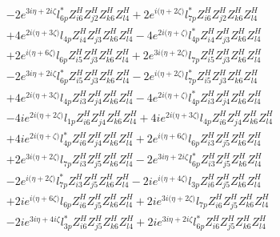 \begin{align}
 &-2 e^{3 i \eta +2 i \zeta } l_{6p}^* Z_{{i 6}}^{H} Z_{{j 2}}^{H} Z_{{k 6}}^{H} Z_{{l 4}}^{H} +2 e^{i \Big(\eta +2 \zeta \Big)} l_{7p}^* Z_{{i 6}}^{H} Z_{{j 2}}^{H} Z_{{k 6}}^{H} Z_{{l 4}}^{H} \nonumber \\ 
 &+4 e^{2 i \Big(\eta +3 \zeta \Big)} l_{4p} Z_{{i 4}}^{H} Z_{{j 3}}^{H} Z_{{k 6}}^{H} Z_{{l 4}}^{H} -4 e^{2 i \Big(\eta +\zeta \Big)} l_{4p}^* Z_{{i 4}}^{H} Z_{{j 3}}^{H} Z_{{k 6}}^{H} Z_{{l 4}}^{H} \nonumber \\ 
 &+2 e^{i \Big(\eta +6 \zeta \Big)} l_{6p} Z_{{i 5}}^{H} Z_{{j 3}}^{H} Z_{{k 6}}^{H} Z_{{l 4}}^{H} +2 e^{3 i \Big(\eta +2 \zeta \Big)} l_{7p} Z_{{i 5}}^{H} Z_{{j 3}}^{H} Z_{{k 6}}^{H} Z_{{l 4}}^{H} \nonumber \\ 
 &-2 e^{3 i \eta +2 i \zeta } l_{6p}^* Z_{{i 5}}^{H} Z_{{j 3}}^{H} Z_{{k 6}}^{H} Z_{{l 4}}^{H} -2 e^{i \Big(\eta +2 \zeta \Big)} l_{7p}^* Z_{{i 5}}^{H} Z_{{j 3}}^{H} Z_{{k 6}}^{H} Z_{{l 4}}^{H} \nonumber \\ 
 &+4 e^{2 i \Big(\eta +3 \zeta \Big)} l_{4p} Z_{{i 3}}^{H} Z_{{j 4}}^{H} Z_{{k 6}}^{H} Z_{{l 4}}^{H} -4 e^{2 i \Big(\eta +\zeta \Big)} l_{4p}^* Z_{{i 3}}^{H} Z_{{j 4}}^{H} Z_{{k 6}}^{H} Z_{{l 4}}^{H} \nonumber \\ 
 &-4 i e^{2 i \Big(\eta +2 \zeta \Big)} l_{1p} Z_{{i 6}}^{H} Z_{{j 4}}^{H} Z_{{k 6}}^{H} Z_{{l 4}}^{H} +4 i e^{2 i \Big(\eta +3 \zeta \Big)} l_{4p} Z_{{i 6}}^{H} Z_{{j 4}}^{H} Z_{{k 6}}^{H} Z_{{l 4}}^{H} \nonumber \\ 
 &+4 i e^{2 i \Big(\eta +\zeta \Big)} l_{4p}^* Z_{{i 6}}^{H} Z_{{j 4}}^{H} Z_{{k 6}}^{H} Z_{{l 4}}^{H} +2 e^{i \Big(\eta +6 \zeta \Big)} l_{6p} Z_{{i 3}}^{H} Z_{{j 5}}^{H} Z_{{k 6}}^{H} Z_{{l 4}}^{H} \nonumber \\ 
 &+2 e^{3 i \Big(\eta +2 \zeta \Big)} l_{7p} Z_{{i 3}}^{H} Z_{{j 5}}^{H} Z_{{k 6}}^{H} Z_{{l 4}}^{H} -2 e^{3 i \eta +2 i \zeta } l_{6p}^* Z_{{i 3}}^{H} Z_{{j 5}}^{H} Z_{{k 6}}^{H} Z_{{l 4}}^{H} \nonumber \\ 
 &-2 e^{i \Big(\eta +2 \zeta \Big)} l_{7p}^* Z_{{i 3}}^{H} Z_{{j 5}}^{H} Z_{{k 6}}^{H} Z_{{l 4}}^{H} -2 i e^{i \Big(\eta +4 \zeta \Big)} l_{3p} Z_{{i 6}}^{H} Z_{{j 5}}^{H} Z_{{k 6}}^{H} Z_{{l 4}}^{H} \nonumber \\ 
 &+2 i e^{i \Big(\eta +6 \zeta \Big)} l_{6p} Z_{{i 6}}^{H} Z_{{j 5}}^{H} Z_{{k 6}}^{H} Z_{{l 4}}^{H} +2 i e^{3 i \Big(\eta +2 \zeta \Big)} l_{7p} Z_{{i 6}}^{H} Z_{{j 5}}^{H} Z_{{k 6}}^{H} Z_{{l 4}}^{H} \nonumber \\ 
 &-2 i e^{3 i \eta +4 i \zeta } l_{3p}^* Z_{{i 6}}^{H} Z_{{j 5}}^{H} Z_{{k 6}}^{H} Z_{{l 4}}^{H} +2 i e^{3 i \eta +2 i \zeta } l_{6p}^* Z_{{i 6}}^{H} Z_{{j 5}}^{H} Z_{{k 6}}^{H} Z_{{l 4}}^{H} \nonumber \\ 

\end{align}
